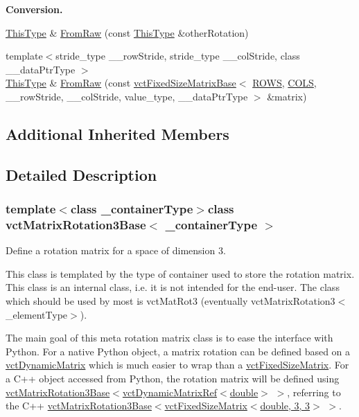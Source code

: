 \begin{Indent}{\bf Conversion.}
\begin{DoxyCompactItemize}
\item 
\hyperlink{classvct_matrix_rotation3_base_a027be766cb10ca3c2ad8e85c28ed0af9}{This\-Type} \& \hyperlink{classvct_matrix_rotation3_base_a84f558161357fe95d0b476ba404589f0}{From\-Raw} (const \hyperlink{classvct_matrix_rotation3_base_a027be766cb10ca3c2ad8e85c28ed0af9}{This\-Type} \&other\-Rotation)
\item 
{\footnotesize template$<$stride\-\_\-type \-\_\-\-\_\-row\-Stride, stride\-\_\-type \-\_\-\-\_\-col\-Stride, class \-\_\-\-\_\-data\-Ptr\-Type $>$ }\\\hyperlink{classvct_matrix_rotation3_base_a027be766cb10ca3c2ad8e85c28ed0af9}{This\-Type} \& \hyperlink{classvct_matrix_rotation3_base_a660c5afd554f60360ef013b3545a2e25}{From\-Raw} (const \hyperlink{classvct_fixed_size_matrix_base}{vct\-Fixed\-Size\-Matrix\-Base}$<$ \hyperlink{classvct_matrix_rotation3_base_abdf4d3751b8966af4ef69c15998d4115a262124a9ac112fef9aa619bd72e5c5f5}{R\-O\-W\-S}, \hyperlink{classvct_matrix_rotation3_base_abdf4d3751b8966af4ef69c15998d4115a55a02c6e4641f16f1c7ca8ba88e47d79}{C\-O\-L\-S}, \-\_\-\-\_\-row\-Stride, \-\_\-\-\_\-col\-Stride, value\-\_\-type, \-\_\-\-\_\-data\-Ptr\-Type $>$ \&matrix)
\end{DoxyCompactItemize}
\end{Indent}
\subsection*{Additional Inherited Members}


\subsection{Detailed Description}
\subsubsection*{template$<$class \-\_\-container\-Type$>$class vct\-Matrix\-Rotation3\-Base$<$ \-\_\-container\-Type $>$}

Define a rotation matrix for a space of dimension 3. 

This class is templated by the type of container used to store the rotation matrix. This class is an internal class, i.\-e. it is not intended for the end-\/user. The class which should be used by most is vct\-Mat\-Rot3 (eventually vct\-Matrix\-Rotation3$<$\-\_\-element\-Type$>$).

The main goal of this meta rotation matrix class is to ease the interface with Python. For a native Python object, a matrix rotation can be defined based on a \hyperlink{classvct_dynamic_matrix}{vct\-Dynamic\-Matrix} which is much easier to wrap than a \hyperlink{classvct_fixed_size_matrix}{vct\-Fixed\-Size\-Matrix}. For a C++ object accessed from Python, the rotation matrix will be defined using \hyperlink{classvct_matrix_rotation3_base}{vct\-Matrix\-Rotation3\-Base}$<$\hyperlink{classvct_dynamic_matrix_ref}{vct\-Dynamic\-Matrix\-Ref$<$double$>$} $>$, referring to the C++ \hyperlink{classvct_matrix_rotation3_base}{vct\-Matrix\-Rotation3\-Base}$<$\hyperlink{classvct_fixed_size_matrix}{vct\-Fixed\-Size\-Matrix$<$double, 3, 3$>$} $>$.



